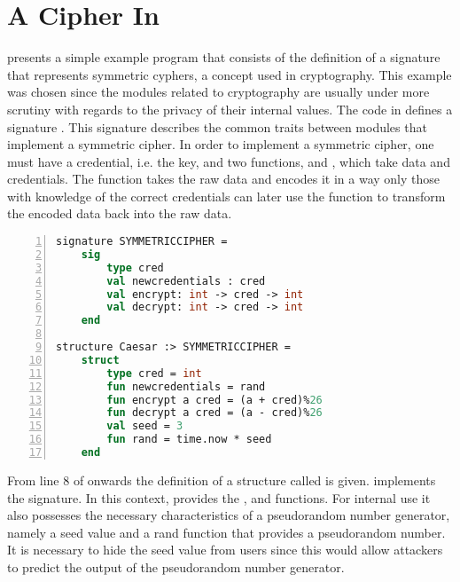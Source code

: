 \section{A Cipher In \MiniML}
\label{sec:MLExample}
 presents a simple example program that consists of the definition of a signature that represents symmetric cyphers, a concept used in cryptography.
This example was chosen since the modules related to cryptography are usually under more scrutiny with regards to the privacy of their internal values.
The code in  defines a signature .
This signature describes the common traits between modules that implement a symmetric cipher.
In order to implement a symmetric cipher, one must have a credential, i.e. the key, and two functions,  and , which take data and credentials.
The  function takes the raw data and encodes it in a way only those with knowledge of the correct credentials can later use the  function to transform the encoded data back into the raw data.

\begin{lstlisting}[frame=single, language=ML,numbers=left, label=code:Example, caption={[Caesar Cipher Example]Example of a security sensitive module specifying and implementing a symmetric cypher.}]
signature SYMMETRICCIPHER =
    sig 
        type cred
        val newcredentials : cred
        val encrypt: int -> cred -> int
        val decrypt: int -> cred -> int
    end

structure Caesar :> SYMMETRICCIPHER =
    struct
        type cred = int
        fun newcredentials = rand
        fun encrypt a cred = (a + cred)%26
        fun decrypt a cred = (a - cred)%26
        val seed = 3
        fun rand = time.now * seed
    end
\end{lstlisting}

From line 8 of  onwards the definition of a structure called  is given.
 implements the  signature.
In this context,  provides the ,  and  functions.
For internal use it also possesses the necessary characteristics of a pseudorandom number generator, namely a seed value and a rand function that provides a pseudorandom number.
It is necessary to hide the seed value from users since this would allow attackers to predict the output of the pseudorandom number generator.

